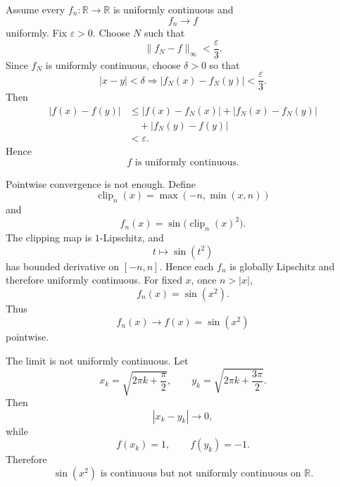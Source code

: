\begin{solution}
Assume every \(f_n:\mathbb R\to\mathbb R\) is uniformly continuous and
\[
f_n\to f
\]
uniformly. Fix \(\varepsilon>0\). Choose \(N\) such that
\[
\|f_N-f\|_\infty<\frac{\varepsilon}{3}.
\]
Since \(f_N\) is uniformly continuous, choose \(\delta>0\) so that
\[
|x-y|<\delta
\Longrightarrow
|f_N(x)-f_N(y)|<\frac{\varepsilon}{3}.
\]
Then
\[
\begin{aligned}
|f(x)-f(y)|
&\le
|f(x)-f_N(x)|
+
|f_N(x)-f_N(y)|\\
&\quad+
|f_N(y)-f(y)|\\
&<
\varepsilon.
\end{aligned}
\]
Hence
\[
\boxed{
f\text{ is uniformly continuous}.
}
\]

Pointwise convergence is not enough. Define
\[
\operatorname{clip}_n(x)
=
\max(-n,\min(x,n))
\]
and
\[
f_n(x)
=
\sin\bigl(\operatorname{clip}_n(x)^2\bigr).
\]
The clipping map is \(1\)-Lipschitz, and
\[
t\mapsto\sin(t^2)
\]
has bounded derivative on \([-n,n]\). Hence each \(f_n\) is globally Lipschitz and therefore
uniformly continuous. For fixed \(x\), once \(n>|x|\),
\[
f_n(x)=\sin(x^2).
\]
Thus
\[
f_n(x)\to f(x)=\sin(x^2)
\]
pointwise.

The limit is not uniformly continuous. Let
\[
x_k=\sqrt{2\pi k+\frac{\pi}{2}},
\qquad
y_k=\sqrt{2\pi k+\frac{3\pi}{2}}.
\]
Then
\[
|x_k-y_k|\to0,
\]
while
\[
f(x_k)=1,
\qquad
f(y_k)=-1.
\]
Therefore
\[
\boxed{
\sin(x^2)
\text{ is continuous but not uniformly continuous on }\mathbb R.
}
\]
\end{solution}


